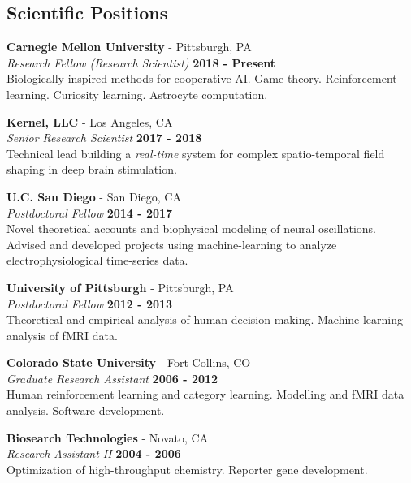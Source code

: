 \documentclass[margin,line]{res}
\begin{document}
\begin{resume}
\section{\sc Scientific Positions}

{\bf Carnegie Mellon University} - Pittsburgh, PA \\
{\em Research Fellow (Research Scientist)} \hfill {\bf 2018 - Present}\\
Biologically-inspired methods for cooperative AI. Game theory. Reinforcement learning. Curiosity learning. Astrocyte computation.

{\bf Kernel, LLC} - Los Angeles, CA\\
{\em Senior Research Scientist} \hfill {\bf 2017 - 2018}\\
Technical lead building a \emph{real-time} system for complex spatio-temporal field shaping in deep brain stimulation.

{\bf U.C. San Diego} - San Diego, CA\\
{\em Postdoctoral Fellow} \hfill {\bf 2014 - 2017}\\
Novel theoretical accounts and biophysical modeling of neural oscillations. Advised and developed projects using machine-learning to analyze electrophysiological time-series data.

{\bf University of Pittsburgh} - Pittsburgh, PA\\
{\em Postdoctoral Fellow} \hfill {\bf 2012 - 2013}\\
Theoretical and empirical analysis of human decision making. Machine learning analysis of fMRI data.

{\bf Colorado State University} - Fort Collins, CO\\
{\em Graduate Research Assistant} \hfill {\bf 2006 - 2012}\\
Human reinforcement learning and category learning. Modelling and fMRI data analysis. Software development.

{\bf Biosearch Technologies} - Novato, CA\\
{\em Research Assistant II} \hfill {\bf 2004 - 2006}\\
Optimization of high-throughput chemistry. Reporter gene development.


\end{resume}
\end{document}
